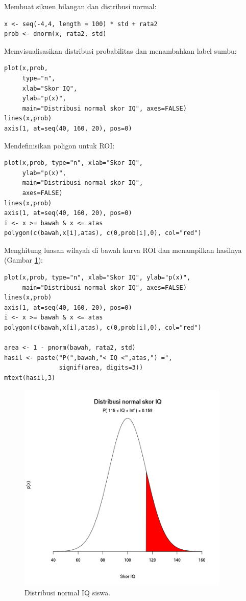 Membuat sikuen bilangan dan distribusi normal:

\begin{verbatim}
x <- seq(-4,4, length = 100) * std + rata2
prob <- dnorm(x, rata2, std)
\end{verbatim}

Memvisualisasikan distribusi probabilitas dan menambahkan label sumbu:

\begin{verbatim}
plot(x,prob,
     type="n", 
     xlab="Skor IQ",
     ylab="p(x)",
     main="Distribusi normal skor IQ", axes=FALSE)
lines(x,prob)
axis(1, at=seq(40, 160, 20), pos=0)
\end{verbatim}

Mendefinisikan poligon untuk ROI:

\begin{verbatim}
plot(x,prob, type="n", xlab="Skor IQ", 
     ylab="p(x)", 
     main="Distribusi normal skor IQ",
     axes=FALSE)
lines(x,prob)
axis(1, at=seq(40, 160, 20), pos=0)
i <- x >= bawah & x <= atas
polygon(c(bawah,x[i],atas), c(0,prob[i],0), col="red") 
\end{verbatim}

Menghitung luasan wilayah di bawah kurva ROI dan menampilkan hasilnya (Gambar \ref{fig:fig11}):

\begin{verbatim}
plot(x,prob, type="n", xlab="Skor IQ", ylab="p(x)", 
     main="Distribusi normal skor IQ", axes=FALSE)
lines(x,prob)
axis(1, at=seq(40, 160, 20), pos=0)
i <- x >= bawah & x <= atas
polygon(c(bawah,x[i],atas), c(0,prob[i],0), col="red") 

area <- 1 - pnorm(bawah, rata2, std)
hasil <- paste("P(",bawah,"< IQ <",atas,") =", 
               signif(area, digits=3))
mtext(hasil,3)
\end{verbatim}

\begin{figure}[H]
    \centering
    \includegraphics[width=0.9\textwidth]{gambar/gmb11.png}
    \caption{Distribusi normal IQ siswa.}
    \label{fig:fig11}
\end{figure}

